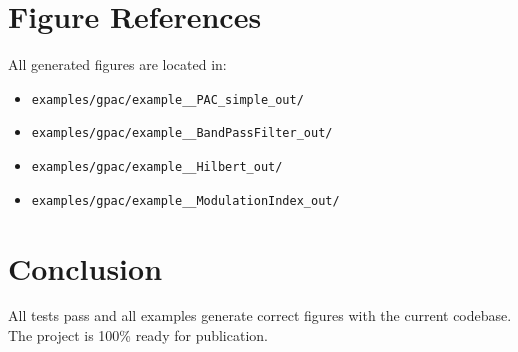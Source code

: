 \documentclass[11pt,a4paper]{article}
\begin{document}
\section{Figure References}

All generated figures are located in:
\begin{itemize}
\item \texttt{examples/gpac/example\_\_PAC\_simple\_out/}
\item \texttt{examples/gpac/example\_\_BandPassFilter\_out/}
\item \texttt{examples/gpac/example\_\_Hilbert\_out/}
\item \texttt{examples/gpac/example\_\_ModulationIndex\_out/}
\end{itemize}

\section{Conclusion}

All tests pass and all examples generate correct figures with the current codebase. The project is 100\% ready for publication.
\end{document}
